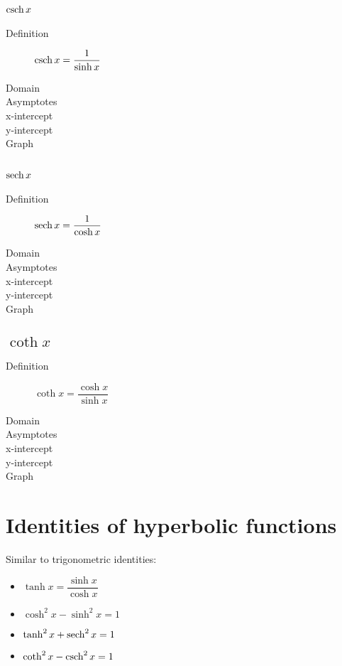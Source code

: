 \subsection{$\operatorname{csch} x$}
\begin{description}
	\item[Definition] $\operatorname{csch} x = \dfrac{1}{\sinh x}$
	\item[Domain] 
	\item[Asymptotes] 
	\item[x-intercept] 
	\item[y-intercept] 
	\item[Graph]
\end{description}


\subsection{$\operatorname{sech} x$}
\begin{description}
	\item[Definition] $\operatorname{sech} x = \dfrac{1}{\cosh x}$
	\item[Domain] 
	\item[Asymptotes] 
	\item[x-intercept] 
	\item[y-intercept] 
	\item[Graph]
\end{description}


\subsection{$\coth x$}
\begin{description}
	\item[Definition] $\coth x = \dfrac{\cosh x}{\sinh x}$
	\item[Domain] 
	\item[Asymptotes] 
	\item[x-intercept] 
	\item[y-intercept] 
	\item[Graph]
\end{description}

\section{Identities of hyperbolic functions}
Similar to trigonometric identities:
\begin{itemize}
	\item $\tanh x = \dfrac{\sinh x}{\cosh x}$
	\item $\cosh^2 x - \sinh^2 x = 1$
	\item $\tanh^2 x + \operatorname{sech}^2 x= 1$
	\item $\coth^2 x - \operatorname{csch}^2 x = 1$
\end{itemize}

